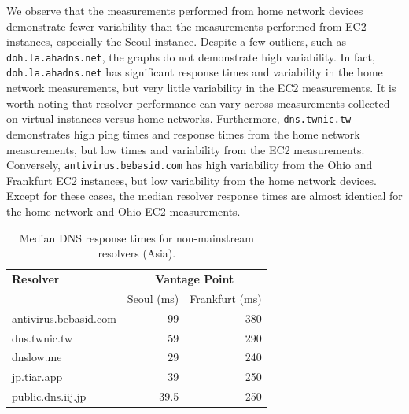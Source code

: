We observe that the measurements performed from home network devices 
demonstrate fewer variability than the measurements performed from EC2 instances, 
especially the Seoul instance. Despite a few outliers, such as \texttt{doh.la.ahadns.net}, 
the graphs do not demonstrate high variability. In fact, \texttt{doh.la.ahadns.net} has significant response times and variability in the home network measurements, but very little variability in the EC2 measurements. It is worth noting that resolver performance can vary across measurements collected on virtual instances versus home networks. Furthermore, \texttt{dns.twnic.tw} demonstrates high ping times and response times from the home network measurements, but low times and variability from the EC2 measurements. Conversely, \texttt{antivirus.bebasid.com} has high variability from the Ohio and Frankfurt EC2 instances, but low variability from the home network devices. 
Except for these cases, the median resolver response times are almost identical for the home network and Ohio EC2 measurements. 

\begin{table}[t!]
\centering
\begin{tabular}{l|rr}
\toprule
    \textbf{Resolver} & \multicolumn{2}{c}{\textbf{Vantage Point}} \\
                  & \textrm{Seoul (ms)}         & \textrm{Frankfurt (ms)} \\
\midrule
antivirus.bebasid.com                                & 99 & 380                            \\
dns.twnic.tw                          & 59                                          & 290                              \\
dnslow.me                                & 29                                           & 240                              \\
jp.tiar.app                            & 39                                           & 250                             \\
public.dns.iij.jp                              & 39.5                                           & 250                               \\
\bottomrule
\end{tabular}
    \caption{Median DNS response times for non-mainstream resolvers (Asia).}
\label{tab:UnconvAsia}
\end{table}

